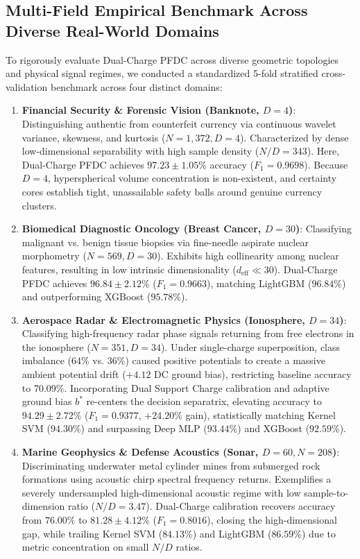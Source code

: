 \documentclass[preprint,review,12pt]{elsarticle}
\begin{document}
\subsection{Multi-Field Empirical Benchmark Across Diverse Real-World Domains}
\label{sec:four_fields}
To rigorously evaluate Dual-Charge PFDC across diverse geometric topologies and physical signal regimes, we conducted a standardized 5-fold stratified cross-validation benchmark across four distinct domains:
\begin{enumerate}
    \item \textbf{Financial Security \& Forensic Vision (Banknote, $D=4$)}: Distinguishing authentic from counterfeit currency via continuous wavelet variance, skewness, and kurtosis ($N=1,372, D=4$). Characterized by dense low-dimensional separability with high sample density ($N/D = 343$). Here, Dual-Charge PFDC achieves \textbf{$97.23 \pm 1.05\%$} accuracy ($F_1 = 0.9698$). Because $D=4$, hyperspherical volume concentration is non-existent, and certainty cores establish tight, unassailable safety balls around genuine currency clusters.
    \item \textbf{Biomedical Diagnostic Oncology (Breast Cancer, $D=30$)}: Classifying malignant vs. benign tissue biopsies via fine-needle aspirate nuclear morphometry ($N=569, D=30$). Exhibits high collinearity among nuclear features, resulting in low intrinsic dimensionality ($d_{\mathrm{eff}} \ll 30$). Dual-Charge PFDC achieves \textbf{$96.84 \pm 2.12\%$} ($F_1 = 0.9663$), matching LightGBM ($96.84\%$) and outperforming XGBoost ($95.78\%$).
    \item \textbf{Aerospace Radar \& Electromagnetic Physics (Ionosphere, $D=34$)}: Classifying high-frequency radar phase signals returning from free electrons in the ionosphere ($N=351, D=34$). Under single-charge superposition, class imbalance (64\% vs. 36\%) caused positive potentials to create a massive ambient potential drift ($+4.12$ DC ground bias), restricting baseline accuracy to 70.09\%. Incorporating Dual Support Charge calibration and adaptive ground bias $b^*$ re-centers the decision separatrix, elevating accuracy to \textbf{$94.29 \pm 2.72\%$} ($F_1 = 0.9377$, $+24.20\%$ gain), statistically matching Kernel SVM ($94.30\%$) and surpassing Deep MLP ($93.44\%$) and XGBoost ($92.59\%$).
    \item \textbf{Marine Geophysics \& Defense Acoustics (Sonar, $D=60, N=208$)}: Discriminating underwater metal cylinder mines from submerged rock formations using acoustic chirp spectral frequency returns. Exemplifies a severely undersampled high-dimensional acoustic regime with low sample-to-dimension ratio ($N/D = 3.47$). Dual-Charge calibration recovers accuracy from $76.00\%$ to \textbf{$81.28 \pm 4.12\%$} ($F_1 = 0.8016$), closing the high-dimensional gap, while trailing Kernel SVM ($84.13\%$) and LightGBM ($86.59\%$) due to metric concentration on small $N/D$ ratios.
\end{enumerate}
\end{document}

